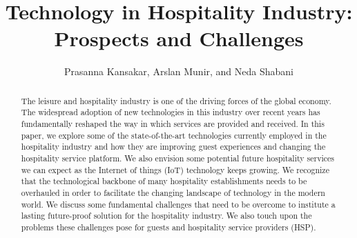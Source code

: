 \documentclass[10pt,journal,letterpaper]{IEEEtran}
\begin{document}
%
%
\title
  {
  Technology in Hospitality Industry: Prospects and Challenges
  }
%
%
\author
  {
		\IEEEauthorblockN
    {
    Prasanna Kansakar,
    Arslan Munir, and
    Neda Shabani%
    }
  }

\maketitle
%
%
\begin{abstract}
%
The leisure and hospitality industry is one of the driving forces of the global economy. The widespread adoption of new technologies in this industry over recent years has fundamentally reshaped the way in which services are provided and received. In this paper, we explore some of the state-of-the-art technologies currently employed in the hospitality industry and how they are improving guest experiences and changing the hospitality service platform. We also envision some potential future hospitality services we can expect as the Internet of things (IoT) technology keeps growing. We recognize that the technological backbone of many hospitality establishments needs to be overhauled in order to facilitate the changing landscape of technology in the modern world. We discuss some fundamental challenges that need to be overcome to institute a lasting future-proof solution for the hospitality industry. We also touch upon the problems these challenges pose for guests and hospitality service providers (HSP). 
\end{abstract}
%
\sloppy
\end{document}
